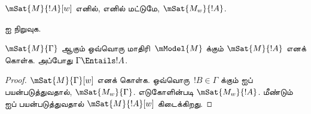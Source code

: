 \documentclass[../../../include/open-logic-section]{subfiles}
\begin{document}
\begin{prop}
  $\mSat{M}{!A}[w]$ எனில், எனில் மட்டுமே, $\mSat{M_w}{!A}$.
\end{prop}

\begin{prob}
   ஐ நிறுவுக.
\end{prob}

\begin{prop}
  $\mSat{M}{\Gamma}$ ஆகும் ஒவ்வொரு மாதிரி~$\mModel{M}$ க்கும்
  $\mSat{M}{!A}$ எனக் கொள்க. அப்போது $\Gamma \Entails !A$.
\end{prop}

\begin{proof}
  $\mSat{M}{\Gamma}[w]$ எனக் கொள்க. ஒவ்வொரு~$!B \in \Gamma$ க்கும்
   ஐப் பயன்படுத்துவதால், $\mSat{M_w}{\Gamma}$.
  எடுகோளின்படி $\mSat{M_w}{!A}$. மீண்டும்  ஐப்
  பயன்படுத்துவதால் $\mSat{M}{!A}[w]$ கிடைக்கிறது.
\end{proof}
\end{document}

